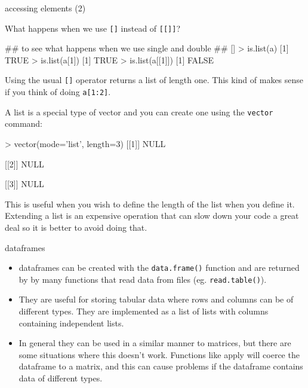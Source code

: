 \documentclass[pdf]{beamer}
\begin{document}
\begin{frame}[fragile]{accessing elements (2)}

  {\small
  What happens when we use \texttt{[]} instead of \texttt{[[]]}?
}
  \begin{rcode}
    ## to see what happens when we use single and double
    ## []
    > is.list(a)
    [1] TRUE
    > is.list(a[1])
    [1] TRUE
    > is.list(a[[1]])
    [1] FALSE
  \end{rcode}
  {\small
  Using the usual \texttt{[]} operator returns a list of length one.
  This kind of makes sense if you think of doing \texttt{a[1:2]}.

  A list is a special type of vector and you can create one using the
  \texttt{vector} command:
  }

  \begin{rcode}
    > vector(mode='list', length=3)
    [[1]]
    NULL
    
    [[2]]
    NULL
    
    [[3]]
    NULL
  \end{rcode}
  {\small
  This is useful when you wish to define the length of the list when you
  define it. Extending a list is an expensive operation that can slow down
  your code a great deal so it is better to avoid doing that.
}
\end{frame}

\begin{frame}[fragile]{dataframes}
  
  {\small
    \begin{itemize}
      \item dataframes can be created with the \texttt{data.frame()} function
        and are returned by by many functions that read data from files
        (eg. \texttt{read.table()}).
      \item They are useful for storing tabular data where rows and columns
        can be of different types. They are implemented as a list of lists
        with columns containing independent lists.
      \item  In general they can be used in a similar manner to matrices, but
        there are some situations where this doesn't work. Functions like
        apply will coerce the dataframe to a matrix, and this can cause problems
        if the dataframe contains data of different types.
      \end{itemize}
  }
\end{frame}
\end{document}
